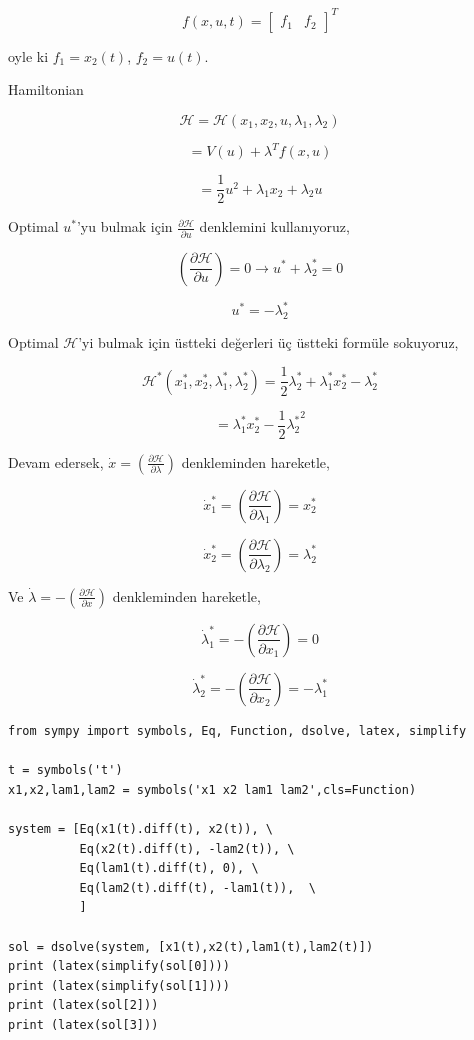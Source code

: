 \documentclass[12pt,fleqn]{article}\usepackage{../../common}
\begin{document}
$$
f(x,u,t) = \left[\begin{array}{cc} f_1 & f_2 \end{array}\right]^T
$$

oyle ki $f_1 = x_2(t)$, $f_2 = u(t)$. 

Hamiltonian

$$
\mathcal{H} = \mathcal{H}(x_1, x_2, u, \lambda_1, \lambda_2)
$$

$$
= V(u) + \lambda^T f(x,u)
$$

$$
= \frac{1}{2} u^2 + \lambda_1 x_2 + \lambda_2 u 
$$

Optimal $u^\ast$'yu bulmak için $\frac{\partial \mathcal{H}}{\partial u}$
denklemini kullanıyoruz,

$$
\left( \frac{\partial \mathcal{H}}{\partial u} \right) = 0 \to
u^\ast + \lambda_2^\ast = 0
$$

$$
u^\ast = -\lambda_2^\ast
$$

Optimal $\mathcal{H}$'yi bulmak için üstteki değerleri üç üstteki
formüle sokuyoruz, 

$$
\mathcal{H}^\ast(x_1^\ast, x_2^\ast,\lambda_1^\ast,\lambda_2^\ast) = 
\frac{1}{2} \lambda_2^\ast + \lambda_1^\ast x_2^\ast - \lambda_2^\ast 
$$

$$
= \lambda_1^\ast x_2^\ast - \frac{1}{2} {\lambda_2^\ast}^2  
$$

Devam edersek, $\dot{x} = \left( \frac{\partial \mathcal{H}}{\partial
\lambda} \right)$  denkleminden hareketle,

$$
\dot{x}^\ast_1 = \left( \frac{\partial \mathcal{H}}{\partial \lambda_1} \right) =
x_2^\ast
$$

$$
\dot{x}^\ast_2 = \left( \frac{\partial \mathcal{H}}{\partial \lambda_2} \right) =
\lambda_2^\ast
$$

Ve $\dot{\lambda} = - \left( \frac{\partial \mathcal{H}}{\partial x}
\right)$ denkleminden hareketle,

$$
\dot{\lambda}_1^\ast = - \left( \frac{\partial \mathcal{H}}{\partial x_1} \right) = 0
$$

$$
\dot{\lambda}_2^\ast = - \left( \frac{\partial \mathcal{H}}{\partial x_2} \right) = 
- \lambda_1^\ast
$$

\begin{verbatim}
from sympy import symbols, Eq, Function, dsolve, latex, simplify

t = symbols('t') 
x1,x2,lam1,lam2 = symbols('x1 x2 lam1 lam2',cls=Function)

system = [Eq(x1(t).diff(t), x2(t)), \
          Eq(x2(t).diff(t), -lam2(t)), \
          Eq(lam1(t).diff(t), 0), \
          Eq(lam2(t).diff(t), -lam1(t)),  \
          ]

sol = dsolve(system, [x1(t),x2(t),lam1(t),lam2(t)])
print (latex(simplify(sol[0])))
print (latex(simplify(sol[1])))
print (latex(sol[2]))
print (latex(sol[3]))
\end{verbatim}
\end{document}
